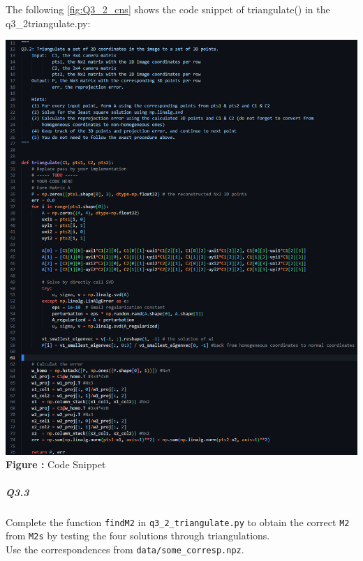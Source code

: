 \begin{your_solution}[title=Q3.2 continued,height=15.5cm,width=\linewidth]
The following \autoref{fig:Q3_2_cns} shows the code snippet of triangulate() in the q3\_2triangulate.py:
\newline

\begin{minipage}{1\linewidth}
	\centering
	\hspace{0.12\linewidth} 
	\includegraphics[width=0.7\linewidth]{../Q3_2_cns.png}  %
	\newline
	\textbf{Figure \thefigure:} Code Snippet %
	\label{fig:Q3_2_cns}  %
\end{minipage}
\end{your_solution}

\subparagraph*{Q3.3}
Complete the function \texttt{findM2} in \texttt{q3\_2\_triangulate.py} to obtain the correct \texttt{M2} from \texttt{M2s} by testing the four solutions through triangulations.\\Use the correspondences from \texttt{data/some\_corresp.npz}.


